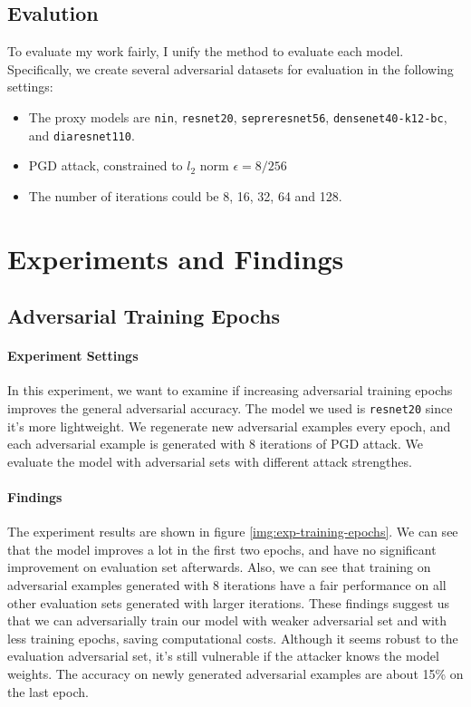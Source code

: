 \documentclass{article}
\begin{document}
\subsection{Evalution}
\label{section:evaluation}
To evaluate my work fairly, I unify the method to evaluate each model. Specifically, we create
several adversarial datasets for evaluation in the following settings:
\begin{itemize}
  \item The proxy models are \texttt{nin}, \texttt{resnet20}, \texttt{sepreresnet56},
  \texttt{densenet40-k12-bc}, and \texttt{diaresnet110}.
  \item PGD attack, constrained to $l_2$ norm $\epsilon = 8 / 256$
  \item The number of iterations could be 8, 16, 32, 64 and 128.
\end{itemize}

\section{Experiments and Findings}

\subsection{Adversarial Training Epochs}
\paragraph{Experiment Settings} In this experiment, we want to examine if increasing adversarial
training epochs improves the general adversarial accuracy. The model we used is \texttt{resnet20}
since it's more lightweight. We regenerate new adversarial examples every epoch, and each
adversarial example is generated with 8 iterations of PGD attack. We evaluate the model with
adversarial sets with different attack strengthes.

\paragraph{Findings} The experiment results are shown in figure \ref{img:exp-training-epochs}. We
can see that the model improves a lot in the first two epochs, and have no significant improvement
on evaluation set afterwards. Also, we can see that training on adversarial examples generated with
8 iterations have a fair performance on all other evaluation sets generated with larger iterations.
These findings suggest us that we can adversarially train our model with weaker adversarial set and
with less training epochs, saving computational costs. Although it seems robust to the evaluation
adversarial set, it's still vulnerable if the attacker knows the model weights. The accuracy on
newly generated adversarial examples are about 15\% on the last epoch.
\end{document}
